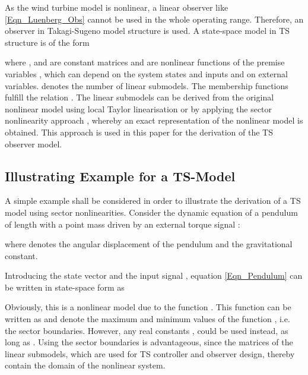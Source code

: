\documentclass[a4paper]{article}
\begin{document}
\newline As the wind turbine model is nonlinear, a linear observer like \eqref{Eqn_Luenberg_Obs} cannot be used in the whole operating range. Therefore, an observer in Takagi-Sugeno model structure is used.
\newline A state-space model in TS structure is of the form




\newline where ,  and  are constant matrices and  are nonlinear functions of the premise variables , which can depend on the system states and inputs and on external variables.  denotes the number of linear submodels. The membership functions  fulfill the relation . The linear submodels can be derived from the original nonlinear model using local Taylor linearisation or by applying the sector nonlinearity approach \cite{TanakaSano2:1994,Tanaka:2001}, whereby an exact representation of the nonlinear model is obtained. This approach is used in this paper for the derivation of the TS observer model.


\newpage

\subsection{\label{Sec_TSExample}Illustrating Example for a TS-Model}

A simple example shall be considered in order to illustrate the derivation of a TS model using sector nonlinearities.
\newline Consider the dynamic equation of a pendulum of length  with a point mass  driven by an external torque signal :


\newline where  denotes the angular displacement of the pendulum and  the gravitational constant.

Introducing the state vector  and the input signal , equation \eqref{Eqn_Pendulum} can be written in state-space form as


\newline Obviously, this is a nonlinear model due to the function . This function can be written as
\newline 
\newline  and  denote the maximum and minimum values of the function , i.e. the sector boundaries. However, any real constants ,  could be used instead, as long as . Using the sector boundaries is advantageous, since the matrices of the linear submodels, which are used for TS controller and observer design, thereby contain the domain of the nonlinear system.
\end{document}
